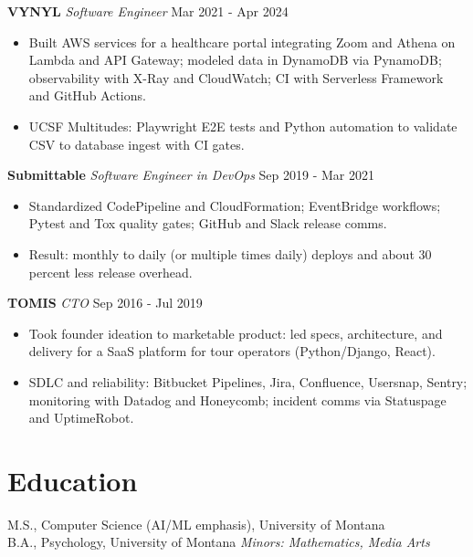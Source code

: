 \documentclass[10pt]{article}
\begin{document}
\noindent\textbf{VYNYL} \textit{Software Engineer} \hfill Mar 2021 - Apr 2024\par
\begin{itemize}
  \item Built AWS services for a healthcare portal integrating Zoom and Athena on Lambda and API Gateway; modeled data in DynamoDB via PynamoDB; observability with X-Ray and CloudWatch; CI with Serverless Framework and GitHub Actions.
  \item UCSF Multitudes: Playwright E2E tests and Python automation to validate CSV to database ingest with CI gates.
\end{itemize}

\noindent\textbf{Submittable} \textit{Software Engineer in DevOps} \hfill Sep 2019 - Mar 2021\par
\begin{itemize}
  \item Standardized CodePipeline and CloudFormation; EventBridge workflows; Pytest and Tox quality gates; GitHub and Slack release comms.
  \item Result: monthly to daily (or multiple times daily) deploys and about 30 percent less release overhead.
\end{itemize}

\noindent\textbf{TOMIS} \textit{CTO} \hfill Sep 2016 - Jul 2019\par
\begin{itemize}
  \item Took founder ideation to marketable product: led specs, architecture, and delivery for a SaaS platform for tour operators (Python/Django, React).
  \item SDLC and reliability: Bitbucket Pipelines, Jira, Confluence, Usersnap, Sentry; monitoring with Datadog and Honeycomb; incident comms via Statuspage and UptimeRobot.
\end{itemize}

\section*{Education}
M.S., Computer Science (AI/ML emphasis), University of Montana \\
B.A., Psychology, University of Montana \quad \emph{Minors: Mathematics, Media Arts}
\end{document}
